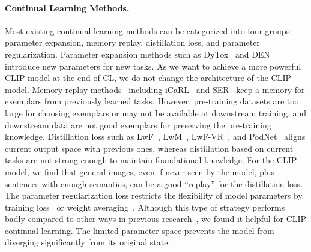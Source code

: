 \paragraph{Continual Learning Methods.} Most existing continual learning methods can be categorized into four groups: parameter expansion, memory replay, distillation loss, and parameter regularization. Parameter expansion methods such as DyTox~\cite{douillard2022dytox} and DEN~\cite{yoon2017lifelong} 
introduce new parameters for new tasks. As we want to achieve a more powerful CLIP model at the end of CL, we do not change the architecture of the CLIP model. Memory replay methods~\cite{shin2017continual,lopez2017gradient,prabhu2020gdumb,lavda2018continual,ostapenko2022continual} including iCaRL~\cite{rebuffi2017icarl} and SER~\cite{isele2018selective} keep a memory for exemplars from previously learned tasks. However, pre-training datasets are too large for choosing exemplars or may not be available at downstream training, and downstream data are not good exemplars for preserving the pre-training knowledge. Distillation loss such as LwF~\cite{li2017learning}, LwM~\cite{dhar2019learning}, LwF-VR~\cite{ding2022don}, and PodNet~\cite{douillard2020podnet} aligns current output space with previous ones, whereas distillation based on current tasks are not strong enough to maintain foundational knowledge. For the CLIP model, we find that general images, even if never seen by the model, plus sentences with enough semantics, can be a good ``replay'' for the distillation loss. The parameter regularization loss restricts the flexibility of model parameters by training loss~\cite{kirkpatrick2017overcoming,zenke2017continual,aljundi2018memory} or weight averaging~\cite{lee2017overcoming,wortsman2022robust}. Although this type of strategy performs badly compared to other ways in previous research~\cite{van2019three,belouadah2021comprehensive}, we found it helpful for CLIP continual learning. The limited parameter space prevents the model from diverging significantly from its original state.

